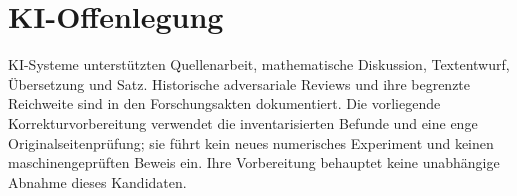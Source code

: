 \section*{KI-Offenlegung}
KI-Systeme unterstützten Quellenarbeit, mathematische Diskussion,
Textentwurf, Übersetzung und Satz. Historische adversariale Reviews und
ihre begrenzte Reichweite sind in den Forschungsakten dokumentiert.
Die vorliegende Korrekturvorbereitung verwendet die inventarisierten
Befunde und eine enge Originalseitenprüfung; sie führt kein neues
numerisches Experiment und keinen maschinengeprüften Beweis ein.
Ihre Vorbereitung behauptet keine unabhängige Abnahme dieses Kandidaten.
